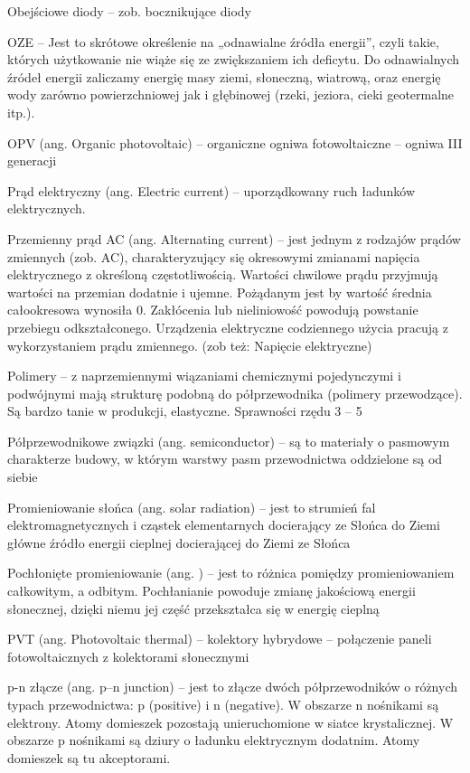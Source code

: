 \documentclass[12pt,a4paper]{article}
\begin{document}
Obejściowe diody – zob. bocznikujące diody

OZE –  Jest to skrótowe określenie na „odnawialne źródła energii”, czyli takie, których użytkowanie nie wiąże się ze zwiększaniem ich deficytu. Do odnawialnych źródeł energii zaliczamy energię masy ziemi, słoneczną, wiatrową, oraz energię wody zarówno powierzchniowej jak i głębinowej (rzeki, jeziora, cieki geotermalne itp.).

OPV (ang. Organic photovoltaic) – organiczne ogniwa fotowoltaiczne – ogniwa III generacji


Prąd elektryczny (ang. Electric current) – uporządkowany ruch ładunków elektrycznych.

Przemienny prąd AC (ang. Alternating current) – jest jednym z rodzajów prądów zmiennych (zob. AC), charakteryzujący się okresowymi zmianami napięcia elektrycznego z określoną częstotliwością. Wartości chwilowe prądu przyjmują wartości na przemian dodatnie i ujemne. Pożądanym jest by wartość średnia całookresowa wynosiła 0. Zakłócenia lub nieliniowość powodują powstanie przebiegu odkształconego. Urządzenia elektryczne codziennego użycia pracują z wykorzystaniem prądu zmiennego. (zob też: Napięcie elektryczne)

Polimery – z naprzemiennymi wiązaniami chemicznymi pojedynczymi i podwójnymi mają strukturę podobną do półprzewodnika (polimery przewodzące). Są bardzo tanie w produkcji, elastyczne. Sprawności rzędu 3 – 5 %

Półprzewodnikowe związki (ang. semiconductor) – są to materiały o pasmowym charakterze budowy, w którym warstwy pasm przewodnictwa oddzielone są od siebie

Promieniowanie słońca (ang. solar radiation) – jest to strumień fal elektromagnetycznych i cząstek elementarnych docierający ze Słońca do Ziemi główne źródło energii cieplnej docierającej do Ziemi ze Słońca

Pochłonięte promieniowanie (ang. ) – jest to różnica pomiędzy promieniowaniem całkowitym, a odbitym. Pochłanianie powoduje zmianę jakościową energii słonecznej, dzięki niemu jej część przekształca się w energię cieplną


PVT (ang. Photovoltaic thermal) – kolektory hybrydowe – połączenie paneli fotowoltaicznych z kolektorami słonecznymi

p-n złącze (ang. p–n junction) – jest to złącze dwóch półprzewodników o różnych typach przewodnictwa: p (positive) i n (negative). W obszarze n nośnikami są elektrony. Atomy domieszek pozostają unieruchomione w siatce krystalicznej. W obszarze p nośnikami są dziury o ładunku elektrycznym dodatnim. Atomy domieszek są tu akceptorami.
\end{document}
